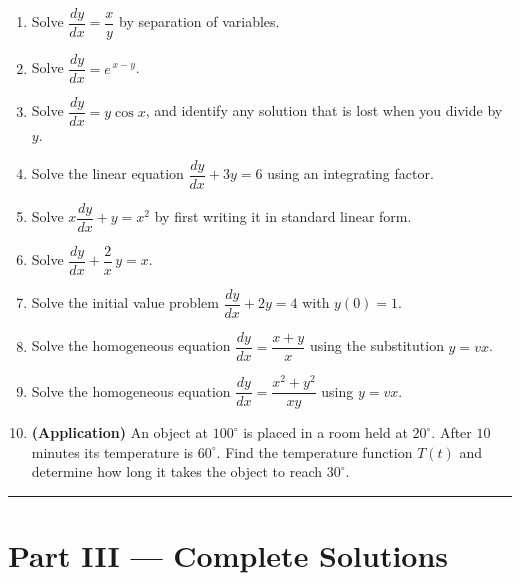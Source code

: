 \documentclass[11pt]{article}
\begin{document}
\begin{enumerate}[leftmargin=2em]
    \item Solve $\dfrac{dy}{dx} = \dfrac{x}{y}$ by separation of variables.

    \item Solve $\dfrac{dy}{dx} = e^{\,x - y}$.

    \item Solve $\dfrac{dy}{dx} = y\cos x$, and identify any solution that is
          lost when you divide by $y$.

    \item Solve the linear equation $\dfrac{dy}{dx} + 3y = 6$ using an
          integrating factor.

    \item Solve $x\dfrac{dy}{dx} + y = x^{2}$ by first writing it in standard
          linear form.

    \item Solve $\dfrac{dy}{dx} + \dfrac{2}{x}\,y = x$.

    \item Solve the initial value problem $\dfrac{dy}{dx} + 2y = 4$ with
          $y(0) = 1$.

    \item Solve the homogeneous equation $\dfrac{dy}{dx} = \dfrac{x + y}{x}$
          using the substitution $y = vx$.

    \item Solve the homogeneous equation
          $\dfrac{dy}{dx} = \dfrac{x^{2} + y^{2}}{xy}$ using $y = vx$.

    \item \textbf{(Application)} An object at $100^{\circ}$ is placed in a room
          held at $20^{\circ}$. After $10$ minutes its temperature is
          $60^{\circ}$. Find the temperature function $T(t)$ and determine how
          long it takes the object to reach $30^{\circ}$.
\end{enumerate}

\vspace{0.4em}
\hrule
\vspace{0.6em}

\clearpage
\section*{Part III --- Complete Solutions}
\end{document}
